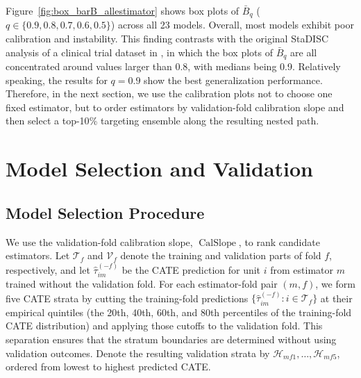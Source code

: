 \documentclass[12pt]{article}
\newcommand{\TargetFrac}{10{\%}\xspace}
\newcommand{\CalSlope}{\ensuremath{\operatorname{CalSlope}}}
\begin{document}
Figure~\ref{fig:box_barB_allestimator} shows box plots of $\bar{B}_{q}$ ($q \in \{0.9,0.8,0.7,0.6,0.5\}$) across all 23 models. Overall, most models exhibit poor calibration and instability. This finding contrasts with the original StaDISC analysis of a clinical trial dataset in \cite{dwivedi2020}, in which the box plots of $\bar{B}_{q}$ are all concentrated around values larger than 0.8, with medians being 0.9. Relatively speaking, the results for $q=0.9$ show the best generalization performance. Therefore, in the next section, we use the calibration plots not to choose one fixed estimator, but to order estimators by validation-fold calibration slope and then select a top-\TargetFrac targeting ensemble along the resulting nested path.

\begingroup{}

\endgroup

\section{Model Selection and Validation}
\label{sec:model_selection}
\label{sec:stability_ranking}

\subsection{Model Selection Procedure}

We use the validation-fold calibration slope, $\CalSlope$, to rank candidate estimators. Let $\mathcal{T}_f$ and $\mathcal{V}_f$ denote the training and validation parts of fold $f$, respectively, and let $\widehat{\tau}_{im}^{(-f)}$ be the CATE prediction for unit $i$ from estimator $m$ trained without the validation fold. For each estimator-fold pair $(m,f)$, we form five CATE strata by cutting the training-fold predictions $\{\widehat{\tau}_{im}^{(-f)}:i\in\mathcal{T}_f\}$ at their empirical quintiles (the 20th, 40th, 60th, and 80th percentiles of the training-fold CATE distribution) and applying those cutoffs to the validation fold. This separation ensures that the stratum boundaries are determined without using validation outcomes. Denote the resulting validation strata by $\mathcal{H}_{mf1},\ldots,\mathcal{H}_{mf5}$, ordered from lowest to highest predicted CATE.
\end{document}
